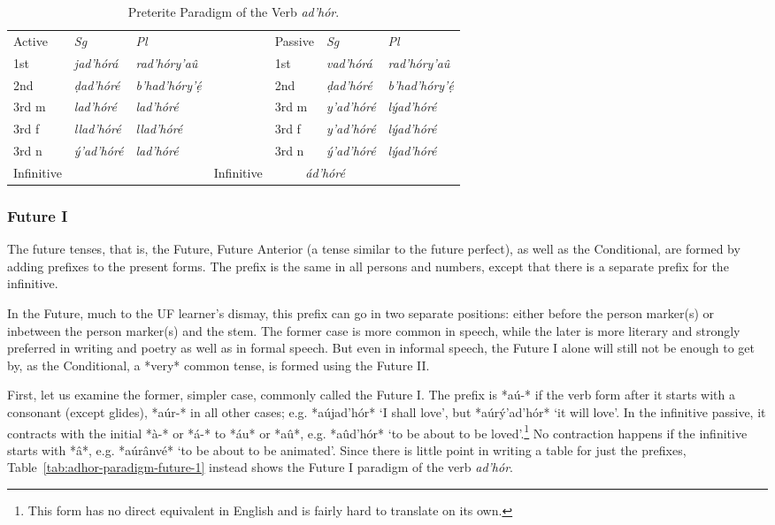 \documentclass[a4paper, 12pt, oneside, final]{article}
\let \nf \normalfont
\begin{document}
\begin{table}[H]
\centering
\noindent\begin{tabular}{@{}|>{}l|>{\it}l|>{\it}l|>{}l|>{}l|>{\it}l|>{\it}l|}\cline{1-3}\cline{5-7}
\nf Active & \nf Sg   & \nf Pl     & \nf & \nf Passive & \nf Sg   & \nf Pl    \\\cline{1-3}\cline{5-7}
1st        & jad’hórá  & rad’hóry’aû     &     & 1st     & vad’hórá  & rad’hóry’aû   \\\cline{1-3}\cline{5-7}
2nd        & ḍad’hóré  & b’had’hóry’ẹ́  &     & 2nd      & ḍad’hóré  & b’had’hóry’ẹ́ \\\cline{1-3}\cline{5-7}
3rd m      & lad’hóré  & lad’hóré    &     & 3rd m      & y’ad’hóré & lýad’hóré  \\\cline{1-3}\cline{5-7}
3rd f      & llad’hóré & llad’hóré   &     & 3rd f      & y’ad’hóré & lýad’hóré  \\\cline{1-3}\cline{5-7}
3rd n      & ý’ad’hóré & lad’hóré   &     & 3rd n       & ý’ad’hóré & lýad’hóré  \\\cline{1-3}\cline{5-7}
Infinitive & \multicolumn{2}{c|}{\it dad’hóré} & & Infinitive & \multicolumn{2}{c|}{\it ád’hóré} \\\cline{1-3}\cline{5-7}
\end{tabular}
\caption{Preterite Paradigm of the Verb \emph{ad’hór}.}\label{tab:adhor-paradigm-pret}
\end{table}

\subsubsection{Future I}
The future tenses, that is, the Future, Future Anterior (a tense similar to the future perfect), as well
as the Conditional, are formed by adding prefixes to the present forms. The prefix is the same in all persons and numbers,
except that there is a separate prefix for the infinitive.

In the Future, much to the UF learner’s dismay, this prefix can go in two separate positions: either before the person marker(s) or
inbetween the person marker(s) and the stem. The former case is more common in speech, while the later is more literary
and strongly preferred in writing and poetry as well as in formal speech. But even in informal speech, the Future I alone
will still not be enough to get by, as the Conditional, a *very* common tense, is formed using the Future II.

First, let us examine the former, simpler case, commonly called the Future I. The prefix is *aú-* if the verb form
after it starts with a consonant (except glides), *aúr-* in all other cases; e.g. *aújad’hór* ‘I shall love’, but
*aúrý’ad’hór* ‘it will love’. In the infinitive passive, it
contracts with the initial *à-* or *á-* to *áu* or *aû*, e.g. *aûd’hór* ‘to be about to be loved’.\footnote{This form
has no direct equivalent in English and is fairly hard to translate on its own.} No contraction happens
if the infinitive starts with *â*, e.g. *aúrânvé* ‘to be about to be animated’. Since
there is little point in writing a table for just the prefixes, Table~\ref{tab:adhor-paradigm-future-1} instead shows the Future I paradigm
of the verb \emph{ad’hór}.
\end{document}
